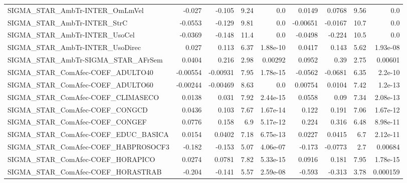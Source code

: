 \begin{tabular}{lrrrrrrrr}
SIGMA\_STAR\_AmbTr-INTER\_OmLmVel         &      -0.027 &       -0.105 &     9.24 &      0.0 &     0.0149 &      0.0768 &         9.56 &           0.0 \\
SIGMA\_STAR\_AmbTr-INTER\_StrC            &     -0.0553 &       -0.129 &     9.81 &      0.0 &   -0.00651 &     -0.0167 &         10.7 &           0.0 \\
SIGMA\_STAR\_AmbTr-INTER\_UsoCel          &     -0.0369 &       -0.148 &     11.4 &      0.0 &    -0.0498 &      -0.224 &         10.5 &           0.0 \\
SIGMA\_STAR\_AmbTr-INTER\_UsoDirec        &       0.027 &        0.113 &     6.37 & 1.88e-10 &     0.0417 &       0.143 &         5.62 &      1.93e-08 \\
SIGMA\_STAR\_AmbTr-SIGMA\_STAR\_AFrSem     &      0.0404 &        0.216 &     2.98 &  0.00292 &     0.0952 &        0.39 &         2.75 &       0.00601 \\
SIGMA\_STAR\_ComAfec-COEF\_ADULTO40       &    -0.00554 &     -0.00931 &     7.95 & 1.78e-15 &    -0.0562 &     -0.0681 &         6.35 &       2.2e-10 \\
SIGMA\_STAR\_ComAfec-COEF\_ADULTO60       &    -0.00244 &     -0.00469 &     8.63 &      0.0 &    0.00754 &      0.0104 &         7.42 &       1.2e-13 \\
SIGMA\_STAR\_ComAfec-COEF\_CLIMASECO      &      0.0138 &        0.031 &     7.92 & 2.44e-15 &     0.0558 &        0.09 &         7.34 &      2.08e-13 \\
SIGMA\_STAR\_ComAfec-COEF\_CONGCD         &      0.0436 &        0.103 &     7.67 & 1.67e-14 &      0.122 &       0.191 &         7.06 &      1.67e-12 \\
SIGMA\_STAR\_ComAfec-COEF\_CONGEF         &      0.0776 &        0.158 &      6.9 & 5.17e-12 &      0.224 &       0.316 &         6.48 &      8.98e-11 \\
SIGMA\_STAR\_ComAfec-COEF\_EDUC\_BASICA    &      0.0154 &       0.0402 &     7.18 & 6.75e-13 &     0.0227 &      0.0415 &          6.7 &      2.12e-11 \\
SIGMA\_STAR\_ComAfec-COEF\_HABPROSOCF3    &      -0.182 &       -0.153 &     5.07 & 4.06e-07 &     -0.173 &     -0.0773 &          2.7 &       0.00684 \\
SIGMA\_STAR\_ComAfec-COEF\_HORAPICO       &      0.0274 &       0.0781 &     7.82 & 5.33e-15 &     0.0916 &       0.181 &         7.95 &      1.78e-15 \\
SIGMA\_STAR\_ComAfec-COEF\_HORASTRAB      &      -0.204 &       -0.141 &     5.57 & 2.59e-08 &     -0.593 &      -0.313 &         3.78 &      0.000159 \\

\end{tabular}

